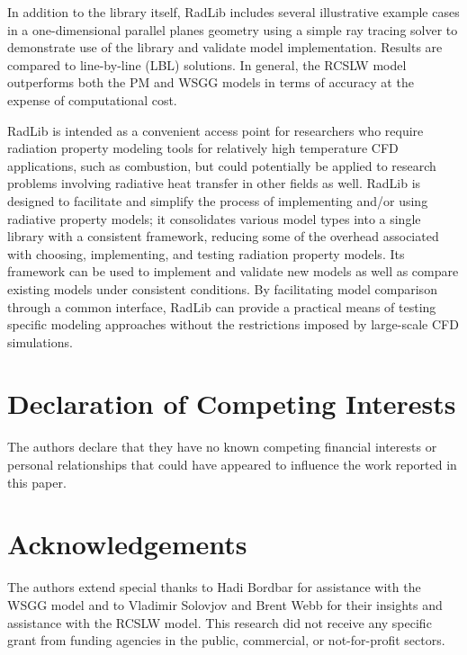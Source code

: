 \documentclass[preprint,12pt]{elsarticle}
\begin{document}
    In addition to the library itself, RadLib includes several illustrative example cases in a one-dimensional parallel planes geometry using a simple ray tracing solver to demonstrate use of the library and validate model implementation. Results are compared to line-by-line (LBL) solutions. In general, the RCSLW model outperforms both the PM and WSGG models in terms of accuracy at the expense of computational cost.

    RadLib is intended as a convenient access point for researchers who require radiation property modeling tools for relatively high temperature CFD applications, such as combustion, but could potentially be applied to research problems involving radiative heat transfer in other fields as well. RadLib is designed to facilitate and simplify the process of implementing and/or using radiative property models; it consolidates various model types into a single library with a consistent framework, reducing some of the overhead associated with choosing, implementing, and testing radiation property models. Its framework can be used to implement and validate new models as well as compare existing models under consistent conditions. By facilitating model comparison through a common interface, RadLib can provide a practical means of testing specific modeling approaches without the restrictions imposed by large-scale CFD simulations.



    \section{Declaration of Competing Interests} \label{s:coi}

    The authors declare that they have no known competing financial interests or personal relationships that could have appeared to influence the work reported in this paper.



    \section*{Acknowledgements} \label{sec:acknowledgements}

    The authors extend special thanks to Hadi Bordbar for assistance with the WSGG model and to Vladimir Solovjov and Brent Webb for their insights and assistance with the RCSLW model.
    This research did not receive any specific grant from funding agencies in the public, commercial, or
    not-for-profit sectors.
\end{document}
